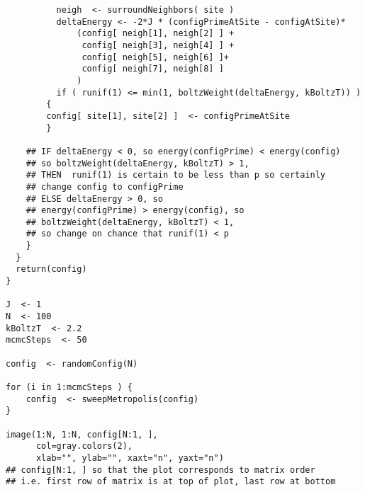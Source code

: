 \begin{description}
\begin{lstlisting}
          neigh  <- surroundNeighbors( site ) 
          deltaEnergy <- -2*J * (configPrimeAtSite - configAtSite)*
              (config[ neigh[1], neigh[2] ] +
               config[ neigh[3], neigh[4] ] +
               config[ neigh[5], neigh[6] ]+
               config[ neigh[7], neigh[8] ]
              )
          if ( runif(1) <= min(1, boltzWeight(deltaEnergy, kBoltzT)) )
        {
        config[ site[1], site[2] ]  <- configPrimeAtSite
        }   

    ## IF deltaEnergy < 0, so energy(configPrime) < energy(config)
    ## so boltzWeight(deltaEnergy, kBoltzT) > 1,
    ## THEN  runif(1) is certain to be less than p so certainly
    ## change config to configPrime
    ## ELSE deltaEnergy > 0, so 
    ## energy(configPrime) > energy(config), so 
    ## boltzWeight(deltaEnergy, kBoltzT) < 1,
    ## so change on chance that runif(1) < p
    }
  }
  return(config)
}

J  <- 1
N  <- 100
kBoltzT  <- 2.2
mcmcSteps  <- 50

config  <- randomConfig(N)

for (i in 1:mcmcSteps ) {
    config  <- sweepMetropolis(config)
}

image(1:N, 1:N, config[N:1, ], 
      col=gray.colors(2),
      xlab="", ylab="", xaxt="n", yaxt="n")
## config[N:1, ] so that the plot corresponds to matrix order
## i.e. first row of matrix is at top of plot, last row at bottom
\end{lstlisting}













\end{description}



